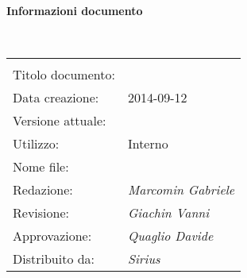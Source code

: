 \noindent\begin{Large}\textbf{Informazioni documento}\end{Large}\\
\begin{center}
\begin{tabular}{ll}
\hline\\
Titolo documento: & \doctitleVN{}\\
Data creazione: & 2014-09-12\\
Versione attuale: & \lastversionVN{}\\
Utilizzo: & Interno\\
Nome file:& \VerbaleN{}\\
Redazione: & \textit{Marcomin Gabriele}\\
Revisione: & \textit{Giachin Vanni}\\
Approvazione: & \textit{Quaglio Davide}\\
Distribuito da:& \textit{Sirius}\\
\end{tabular}
\end{center}

